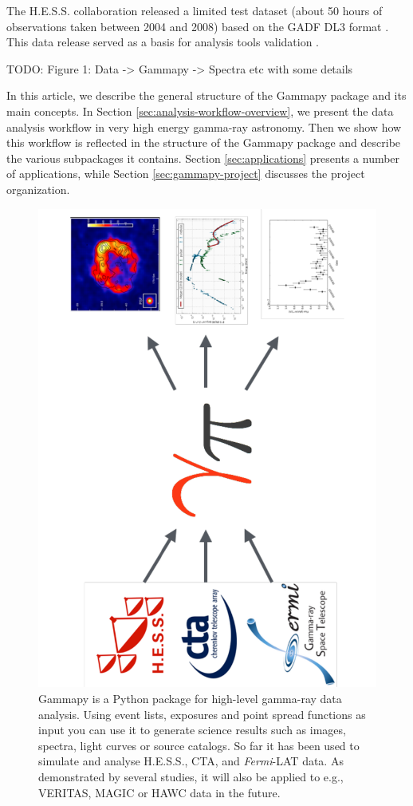 

The H.E.S.S. collaboration released a limited test dataset (about 50 hours of
observations taken between 2004 and 2008) based  on the GADF DL3 format \citep{HESS_DR1}.
This data release served as a basis for analysis tools validation \cite[see e.g.]{Mohrmann2019}.

TODO: Figure 1: Data -> Gammapy -> Spectra etc with some details

In this article, we describe the general structure of the Gammapy package and
its main concepts. In Section \ref{sec:analysis-workflow-overview}, we present
the data analysis workflow in very high energy gamma-ray astronomy. Then we
show how this workflow is reflected in the structure of the Gammapy package and
describe the various subpackages it contains. Section \ref{sec:applications}
presents a number of applications, while Section \ref{sec:gammapy-project}
discusses the project organization.


\begin{figure}[t]
	\centering
	\includegraphics[height=0.5\textwidth,
		angle=270]{static/gammapy-big-picture} \caption{ Gammapy is a Python package
		for high-level gamma-ray data analysis. Using event lists, exposures and point
		spread functions as input you can use it to generate science results such as
		images, spectra, light curves or source catalogs. So far it has been used to
		simulate and analyse H.E.S.S., CTA,  and \textit{Fermi}-LAT data. As demonstrated
		by several studies, it will also be applied to e.g., VERITAS, MAGIC or HAWC data
		in the future. }
	\label{fig:big-picture}

\end{figure}


